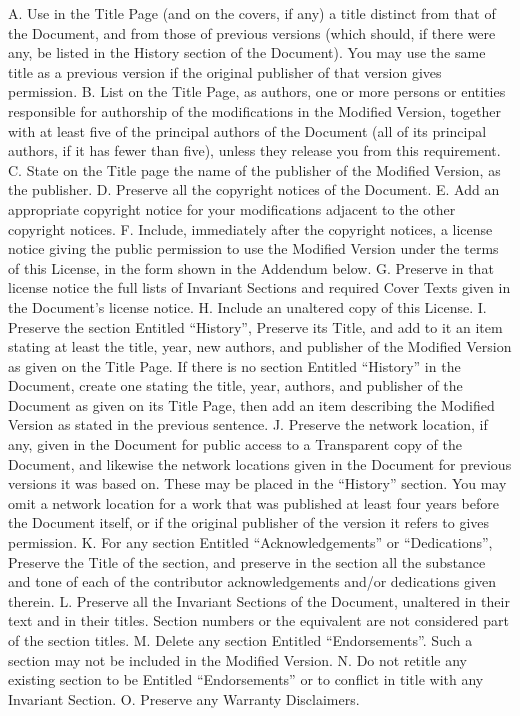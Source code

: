 \documentclass[12pt,a4paperpaper,]{report}
\begin{document}
A. Use in the Title Page (and on the covers, if any) a title distinct
from that of the Document, and from those of previous versions (which
should, if there were any, be listed in the History section of the
Document). You may use the same title as a previous version if the
original publisher of that version gives permission. B. List on the
Title Page, as authors, one or more persons or entities responsible for
authorship of the modifications in the Modified Version, together with
at least five of the principal authors of the Document (all of its
principal authors, if it has fewer than five), unless they release you
from this requirement. C. State on the Title page the name of the
publisher of the Modified Version, as the publisher. D. Preserve all the
copyright notices of the Document. E. Add an appropriate copyright
notice for your modifications adjacent to the other copyright notices.
F. Include, immediately after the copyright notices, a license notice
giving the public permission to use the Modified Version under the terms
of this License, in the form shown in the Addendum below. G. Preserve in
that license notice the full lists of Invariant Sections and required
Cover Texts given in the Document's license notice. H. Include an
unaltered copy of this License. I. Preserve the section Entitled
``History'', Preserve its Title, and add to it an item stating at least
the title, year, new authors, and publisher of the Modified Version as
given on the Title Page. If there is no section Entitled ``History'' in
the Document, create one stating the title, year, authors, and publisher
of the Document as given on its Title Page, then add an item describing
the Modified Version as stated in the previous sentence. J. Preserve the
network location, if any, given in the Document for public access to a
Transparent copy of the Document, and likewise the network locations
given in the Document for previous versions it was based on. These may
be placed in the ``History'' section. You may omit a network location
for a work that was published at least four years before the Document
itself, or if the original publisher of the version it refers to gives
permission. K. For any section Entitled ``Acknowledgements'' or
``Dedications'', Preserve the Title of the section, and preserve in the
section all the substance and tone of each of the contributor
acknowledgements and/or dedications given therein. L. Preserve all the
Invariant Sections of the Document, unaltered in their text and in their
titles. Section numbers or the equivalent are not considered part of the
section titles. M. Delete any section Entitled ``Endorsements''. Such a
section may not be included in the Modified Version. N. Do not retitle
any existing section to be Entitled ``Endorsements'' or to conflict in
title with any Invariant Section. O. Preserve any Warranty Disclaimers.
\end{document}
